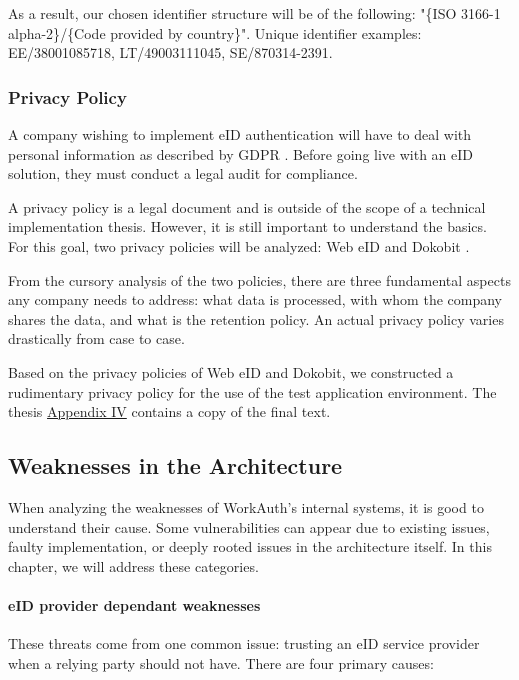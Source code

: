 As a result, our chosen identifier structure will be of the following: "{\{ISO 3166-1 alpha-2\}}/{\{Code provided by country\}}". Unique identifier examples: EE/38001085718, LT/49003111045, SE/870314-2391.

\subsubsection{Privacy Policy}

A company wishing to implement eID authentication will have to deal with personal information as described by GDPR \cite{eulaw-gdpr}. Before going live with an eID solution, they must conduct a legal audit for compliance.

A privacy policy is a legal document and is outside of the scope of a technical implementation thesis. However, it is still important to understand the basics. For this goal, two privacy policies will be analyzed: Web eID \cite{legal-webeid-privacypolicy} and Dokobit \cite{legal-dokobit-privacypolicy}.

From the cursory analysis of the two policies, there are three fundamental aspects any company needs to address: what data is processed, with whom the company shares the data, and what is the retention policy. An actual privacy policy varies drastically from case to case.

Based on the privacy policies of Web eID and Dokobit, we constructed a rudimentary privacy policy for the use of the test application environment. The thesis \hyperref[appendix:privacy]{Appendix IV} contains a copy of the final text.

\subsection{Weaknesses in the Architecture}

When analyzing the weaknesses of WorkAuth's internal systems, it is good to understand their cause. Some vulnerabilities can appear due to existing issues, faulty implementation, or deeply rooted issues in the architecture itself. In this chapter, we will address these categories.

\paragraph{eID provider dependant weaknesses}

These threats come from one common issue: trusting an eID service provider when a relying party should not have. There are four primary causes:

